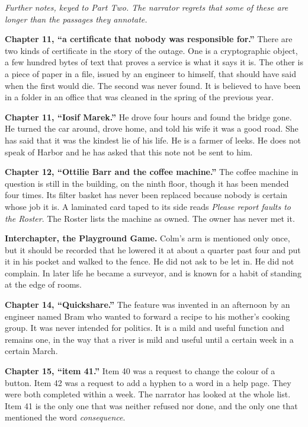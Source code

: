 

{\small

\emph{Further notes, keyed to Part Two. The narrator regrets that some of these are longer than the passages they annotate.}

\textbf{Chapter 11, ``a certificate that nobody was responsible for.''} There are two kinds of certificate in the story of the outage. One is a cryptographic object, a few hundred bytes of text that proves a service is what it says it is. The other is a piece of paper in a file, issued by an engineer to himself, that should have said when the first would die. The second was never found. It is believed to have been in a folder in an office that was cleaned in the spring of the previous year.

\textbf{Chapter 11, ``Iosif Marek.''} He drove four hours and found the bridge gone. He turned the car around, drove home, and told his wife it was a good road. She has said that it was the kindest lie of his life. He is a farmer of leeks. He does not speak of Harbor and he has asked that this note not be sent to him.

\textbf{Chapter 12, ``Ottilie Barr and the coffee machine.''} The coffee machine in question is still in the building, on the ninth floor, though it has been mended four times. Its filter basket has never been replaced because nobody is certain whose job it is. A laminated card taped to its side reads \emph{Please report faults to the Roster}. The Roster lists the machine as owned. The owner has never met it.

\textbf{Interchapter, the Playground Game.} Colm's arm is mentioned only once, but it should be recorded that he lowered it at about a quarter past four and put it in his pocket and walked to the fence. He did not ask to be let in. He did not complain. In later life he became a surveyor, and is known for a habit of standing at the edge of rooms.

\textbf{Chapter 14, ``Quickshare.''} The feature was invented in an afternoon by an engineer named Bram who wanted to forward a recipe to his mother's cooking group. It was never intended for politics. It is a mild and useful function and remains one, in the way that a river is mild and useful until a certain week in a certain March.

\textbf{Chapter 15, ``item 41.''} Item 40 was a request to change the colour of a button. Item 42 was a request to add a hyphen to a word in a help page. They were both completed within a week. The narrator has looked at the whole list. Item 41 is the only one that was neither refused nor done, and the only one that mentioned the word \emph{consequence}.

}
